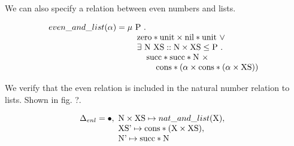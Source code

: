 \documentclass[sigplan]{acmart}
\theoremstyle{definition}
\begin{document}
We can also specify a relation between even numbers and lists.  

\[
even\_and\_list(\alpha) =  
\begin{array}[t]{@{} l}
  \mu\ \text{P}\ .\ 
  \\
  \hspace{4mm}\text{zero}*\text{unit} \times \text{nil}*\text{unit}\ \vee\ 
  \\
  \hspace{4mm}\exists\ \text{N}\ \text{XS} :: \text{N} \times \text{XS} \leq \text{P}\ .\ 
  \\
  \hspace{8mm}\text{succ}*\text{succ}*\text{N}\ \times 
  \\
  \hspace{12mm}\text{cons}*(\alpha \times \text{cons}*(\alpha \times \text{XS}))
\end{array}
\]

We verify that the even relation is included in the natural number relation to lists.  
Shown in fig. ?.

\[
\Delta_{enl} = \bullet,\ 
\begin{array}[t]{@{} l}
  \text{N} \times \text{XS} \mapsto nat\_and\_list(\text{X}),\ 
  \\
  \text{XS'} \mapsto \text{cons}*(\text{X} \times \text{XS}),\ 
  \\
  \text{N'} \mapsto \text{succ}*\text{N}
\end{array}
\]
\end{document}
